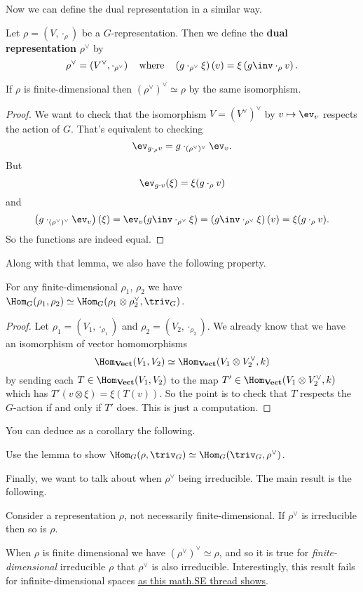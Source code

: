 Now we can define the dual representation in a similar way.
\begin{definition}
	Let $\rho = (V, \cdot_\rho)$ be a $G$-representation.
	Then we define the \textbf{dual representation} $\rho^\vee$ by
	\[ \rho^\vee = \left( V^\vee, \cdot_{\rho^\vee} \right)
		\quad\text{where}\quad
		\left( g \cdot_{\rho^\vee} \xi \right)(v)
		= \xi \left( g\inv \cdot_\rho v \right).
	\]
\end{definition}
\begin{lemma}
	If $\rho$ is finite-dimensional then $(\rho^\vee)^\vee \simeq \rho$ by the same isomorphism.
\end{lemma}
\begin{proof}
	We want to check that the isomorphism $V = (V^\vee)^\vee$ by
	$v \mapsto \ev_v$ respects the action of $G$.
	That's equivalent to checking
	\[ \ev_{g \cdot_\rho v} = g \cdot_{(\rho^\vee)^\vee} \ev_v. \]
	But
	\[
		\ev_{g \cdot v}(\xi)
		= \xi(g \cdot_\rho v)
	\]
	and
	\[
		\left( g \cdot_{(\rho^\vee)^\vee} \ev_v \right)(\xi)
		= 
		\ev_v(g\inv \cdot_{\rho^\vee} \xi)
		= \left( g\inv \cdot_{\rho^\vee} \xi \right)(v)
		= \xi(g \cdot_\rho v).
	\]
	So the functions are indeed equal.
\end{proof}
Along with that lemma, we also have the following property.
\begin{lemma}
	For any finite-dimensional $\rho_1$, $\rho_2$ we have
	$\Hom_G(\rho_1, \rho_2) \simeq \Hom_G(\rho_1 \otimes \rho_2^\vee, \triv_G)$.
\end{lemma}
\begin{proof}
	Let $\rho_1 = (V_1, \cdot_{\rho_1})$
	and $\rho_2 = (V_2, \cdot_{\rho_2})$.
	We already know that we have an isomorphism of vector homomorphisms
	\[
		\Hom_{\textbf{Vect}}(V_1, V_2)
		\simeq \Hom_{\textbf{Vect}} (V_1 \otimes V_2^\vee, k)
	\]
	by sending each $T \in \Hom_{\textbf{Vect}}(V_1, V_2)$
	to the map $T' \in \Hom_{\textbf{Vect}} (V_1 \otimes V_2^\vee, k)$
	which has $T'(v \otimes \xi) = \xi(T(v))$.
	So the point is to check that $T$ respects the $G$-action if and only if $T'$ does.
	This is just a computation.
\end{proof}
You can deduce as a corollary the following.
\begin{ques}
	Use the lemma to show $\Hom_G(\rho, \triv_G) \simeq \Hom_G(\triv_G, \rho^\vee)$.
\end{ques}

Finally, we want to talk about when $\rho^\vee$ being irreducible.
The main result is the following.
\begin{lemma}
	Consider a representation $\rho$, not necessarily finite-dimensional.
	If $\rho^\vee$ is irreducible then so is $\rho$.
\end{lemma}
When $\rho$ is finite dimensional we have $(\rho^\vee)^\vee \simeq \rho$, and so it is true for \emph{finite-dimensional} irreducible $\rho$ that $\rho^\vee$ is also irreducible.
Interestingly, this result fails for infinite-dimensional spaces \href{http://math.stackexchange.com/questions/49907/is-the-dual-representation-of-an-irreducible-representation-always-irreducible}{as this math.SE thread shows}.

